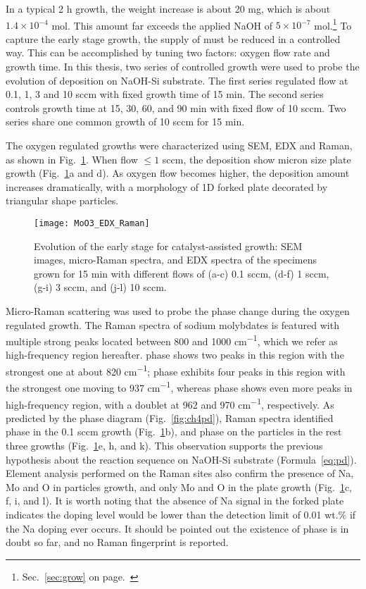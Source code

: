 In a typical 2 h growth, the  weight increase is about 20 mg, which is about $1.4\times 10^{-4}$ mol. This amount far exceeds the applied NaOH of $5\times 10^{-7}$ mol.\footnote{Sec.~\ref{sec:grow} on page.~\pageref{sec:grow}} To capture the early stage growth, the supply of  must be reduced in a controlled way. This can be accomplished by tuning two factors: oxygen flow rate and growth time. In this thesis, two series of controlled growth were used to probe the evolution of  deposition on NaOH-Si substrate. The first series regulated  flow at 0.1, 1, 3 and 10 sccm with fixed growth time of 15 min. The second series controls growth time at 15, 30, 60, and 90 min with fixed  flow of 10 sccm. Two series share one common growth of 10 sccm  for 15 min. 

The oxygen regulated growths were characterized using SEM, EDX and Raman, as shown in Fig.~\ref{fig:ch4oxy}. When  flow $\leq 1$ sccm, the deposition show micron size plate growth (Fig.~\ref{fig:ch4oxy}a and d). As oxygen flow becomes higher, the deposition amount increases dramatically, with a morphology of 1D forked plate decorated by triangular shape particles.
\begin{figure}[htb]
\centering
\texttt{[image: MoO3\_EDX\_Raman]}
\caption[Growth evolution of : first stage]{Evolution of the early stage for catalyst-assisted  growth: SEM images, micro-Raman spectra, and EDX spectra of the specimens grown for 15 min with different  flows of (a-c) 0.1 sccm, (d-f) 1 sccm, (g-i) 3 sccm, and (j-l) 10 sccm. }
\label{fig:ch4oxy}
\end{figure}

Micro-Raman scattering was used to probe the phase change during the oxygen regulated growth. The Raman spectra of sodium molybdates is featured with multiple strong peaks located between 800 and 1000 \si{cm^{-1}}, which we refer as high-frequency region hereafter.  phase shows two peaks in this region with the strongest one at about 820 \si{cm^{-1}};  phase exhibits four peaks in this region with the strongest one moving to 937 \si{cm^{-1}}, whereas  phase shows even more peaks in high-frequency region, with a doublet at 962 and 970 \si{cm^{-1}}, respectively.\cite{Schofield2005,Saraiva2011} As predicted by the phase diagram (Fig.~\ref{fig:ch4pd}), Raman spectra identified  phase in the 0.1 sccm growth (Fig.~\ref{fig:ch4oxy}b), and  phase on the particles in the rest three growths (Fig.~\ref{fig:ch4oxy}e, h, and k). This observation supports the previous hypothesis about the reaction sequence on NaOH-Si substrate (Formula~\ref{eq:pd}). Element analysis performed on the Raman sites also confirm the presence of Na, Mo and O in particles growth, and only Mo and O in the plate growth (Fig.~\ref{fig:ch4oxy}c, f, i, and l). It is worth noting that the absence of Na signal in the forked  plate indicates the doping level would be lower than the detection limit of 0.01 wt.\% if the Na doping ever occurs. It should be pointed out the existence of  phase is in doubt so far, and no Raman fingerprint is reported.\cite{Fomichev1992}  

